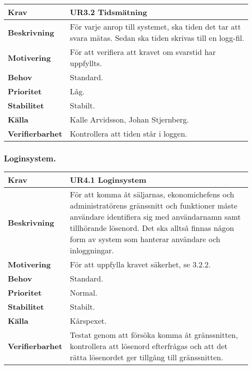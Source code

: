 \documentclass[a4paper, twoside, 11pt, titlepage]{article}
\begin{document}
		\begin{tabular} { p{2.6cm} p{12.5cm} }
			\hline
			\sffamily\textbf{Krav} & \sffamily\textbf{UR3.2 Tidsmätning  } \\
			\hline
			\sffamily\textbf{Beskrivning} & För varje anrop till systemet, ska tiden det tar att svara mätas. Sedan ska tiden skrivas till en logg-fil.  \\
			\hline
			\sffamily\textbf{Motivering} & För att verifiera att kravet om svarstid har uppfyllts.  \\
			\hline
			\sffamily\textbf{Behov} & Standard.  \\
			\hline
			\sffamily\textbf{Prioritet} & Låg.  \\
			\hline
			\sffamily\textbf{Stabilitet} & Stabilt.  \\
			\hline
			\sffamily\textbf{Källa} & Kalle Arvidsson, Johan Stjernberg.  \\
			\hline
			\sffamily\textbf{Verifierbarhet} & Kontrollera att tiden står i loggen.  \\
			\hline
		\end{tabular}


		\subsubsection{Loginsystem.}


		\begin{tabular} { p{2.6cm} p{12.5cm} }
			\hline
			\sffamily\textbf{Krav} & \sffamily\textbf{UR4.1 Loginsystem  } \\
			\hline
			\sffamily\textbf{Beskrivning} & För att komma åt säljarnas, ekonomichefens och administratörens gränssnitt och funktioner måste användare identifiera sig med användarnamn samt tillhörande lösenord. Det ska alltså finnas någon form av system som hanterar användare och inloggningar.  \\
			\hline
			\sffamily\textbf{Motivering} & För att uppfylla kravet säkerhet, se 3.2.2.  \\
			\hline
			\sffamily\textbf{Behov} & Standard.  \\
			\hline
			\sffamily\textbf{Prioritet} & Normal.  \\
			\hline
			\sffamily\textbf{Stabilitet} & Stabilt.  \\
			\hline
			\sffamily\textbf{Källa} & Kårspexet.  \\
			\hline
			\sffamily\textbf{Verifierbarhet} & Testat genom att försöka komma åt gränssnitten, kontrollera att lösenord efterfrågas och att det rätta lösenordet ger tillgång till gränssnitten.  \\
			\hline
		\end{tabular}
		\vspace{6mm}
\end{document}
